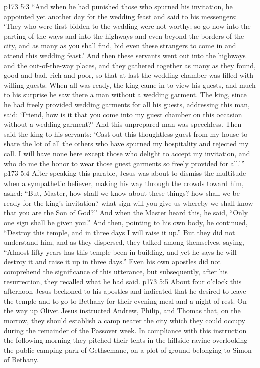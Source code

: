 \vs p173 5:3 \textcolor{ubdarkred}{“And when he had punished those who spurned his invitation, he appointed yet another day for the wedding feast and said to his messengers: ‘They who were first bidden to the wedding were not worthy; so go now into the parting of the ways and into the highways and even beyond the borders of the city, and as many as you shall find, bid even these strangers to come in and attend this wedding feast.’ And then these servants went out into the highways and the out\hyp{}of\hyp{}the\hyp{}way places, and they gathered together as many as they found, good and bad, rich and poor, so that at last the wedding chamber was filled with willing guests. When all was ready, the king came in to view his guests, and much to his surprise he saw there a man without a wedding garment. The king, since he had freely provided wedding garments for all his guests, addressing this man, said: ‘Friend, how is it that you come into my guest chamber on this occasion without a wedding garment?’ And this unprepared man was speechless. Then said the king to his servants: ‘Cast out this thoughtless guest from my house to share the lot of all the others who have spurned my hospitality and rejected my call. I will have none here except those who delight to accept my invitation, and who do me the honor to wear those guest garments so freely provided for all.’”}
\pc \vs p173 5:4 After speaking this parable, Jesus was about to dismiss the multitude when a sympathetic believer, making his way through the crowds toward him, asked: “But, Master, how shall we know about these things? how shall we be ready for the king’s invitation? what sign will you give us whereby we shall know that you are the Son of God?” And when the Master heard this, he said, \textcolor{ubdarkred}{“Only one sign shall be given you.”} And then, pointing to his own body, he continued, \textcolor{ubdarkred}{“Destroy this temple, and in three days I will raise it up.”} But they did not understand him, and as they dispersed, they talked among themselves, saying, “Almost fifty years has this temple been in building, and yet he says he will destroy it and raise it up in three days.” Even his own apostles did not comprehend the significance of this utterance, but subsequently, after his resurrection, they recalled what he had said.
\vs p173 5:5 About four o’clock this afternoon Jesus beckoned to his apostles and indicated that he desired to leave the temple and to go to Bethany for their evening meal and a night of rest. On the way up Olivet Jesus instructed Andrew, Philip, and Thomas that, on the morrow, they should establish a camp nearer the city which they could occupy during the remainder of the Passover week. In compliance with this instruction the following morning they pitched their tents in the hillside ravine overlooking the public camping park of Gethsemane, on a plot of ground belonging to Simon of Bethany.
